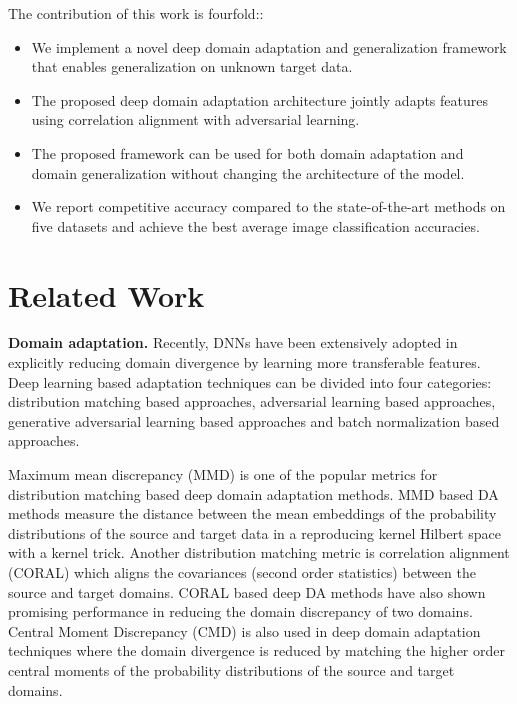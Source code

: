 \documentclass[review]{elsarticle}
\begin{document}
The contribution of this work is fourfold::
\begin{itemize}
\item We implement  a  novel  deep  domain adaptation and generalization framework that enables generalization on unknown target data.


\item The proposed deep domain adaptation architecture jointly adapts features using correlation alignment with adversarial learning.

\item The proposed framework can be used for both domain adaptation and domain generalization without changing the architecture of the model.

\item We report competitive  accuracy  compared  to  the  state-of-the-art  methods on five datasets and achieve the best average image classification accuracies.

\end{itemize}




















\section{Related Work}

\textbf{Domain adaptation.} Recently, DNNs have been extensively adopted in explicitly reducing domain divergence by learning more transferable features. Deep learning based adaptation techniques can be divided into four categories: distribution matching based approaches, adversarial learning based approaches, generative adversarial learning based approaches and batch normalization based approaches. 

Maximum mean discrepancy (MMD) is one of the popular metrics for distribution matching based deep domain adaptation methods. MMD based DA methods \cite{DBLP:conf/icml/LongC0J15,DBLP:conf/nips/LongZ0J16,DBLP:conf/icml/LongZ0J17} measure the distance between the mean embeddings of the probability distributions of the source and target data in a reproducing kernel Hilbert space with a kernel trick. Another distribution matching metric is correlation alignment (CORAL) which aligns the covariances (second order statistics) between the source and target domains. CORAL based deep DA methods \cite{dcoral,DBLP:journals/corr/KoniuszTP16,morerio2018minimalentropy} have also shown promising performance in reducing the domain discrepancy of two domains. Central Moment Discrepancy (CMD) \cite{DBLP:journals/corr/ZellingerGLNS17} is also used in deep domain adaptation techniques where the domain divergence is reduced by matching the higher order central moments of the probability distributions of the source and target domains.
\end{document}
